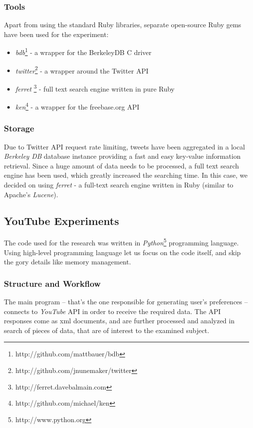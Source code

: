 \subsubsection{Tools}
Apart from using the standard Ruby libraries, separate open-source Ruby gems have been used for the experiment:
\begin{itemize}
  \item \textit{bdb}\footnote{http://github.com/mattbauer/bdb} - a wrapper for the BerkeleyDB C driver
  \item \textit{twitter}\footnote{http://github.com/jnunemaker/twitter} - a wrapper around the Twitter API
  \item \textit{ferret} \footnote{http://ferret.davebalmain.com} - full text search engine written in pure Ruby
  \item \textit{ken}\footnote{http://github.com/michael/ken} - a wrapper for the freebase.org API
\end{itemize}

\subsubsection{Storage}
Due to Twitter API request rate limiting, tweets have been aggregated in a local
\textit{Berkeley DB} database instance providing a fast and easy key-value
information retrieval. Since a huge amount of data needs to be processed, a full
text search engine has been used, which greatly increased the searching time. In
this case, we decided on using \textit{ferret} - a full-text search engine
written in Ruby (similar to Apache's \textit{Lucene}).

\subsection{YouTube Experiments}
The code used for the research was written in \textit{Python}\footnote{http://www.python.org}
programming language. Using high-level programming language let us focus on the code itself, and skip the
gory details like memory management.

\subsubsection{Structure and Workflow}
The main program -- that's the one responsible for generating user's preferences
-- connects to \textit{YouTube} API in order to receive the required data. The
API responses come as xml documents, and are further processed and analyzed in search of
pieces of data, that are of interest to the examined subject.

